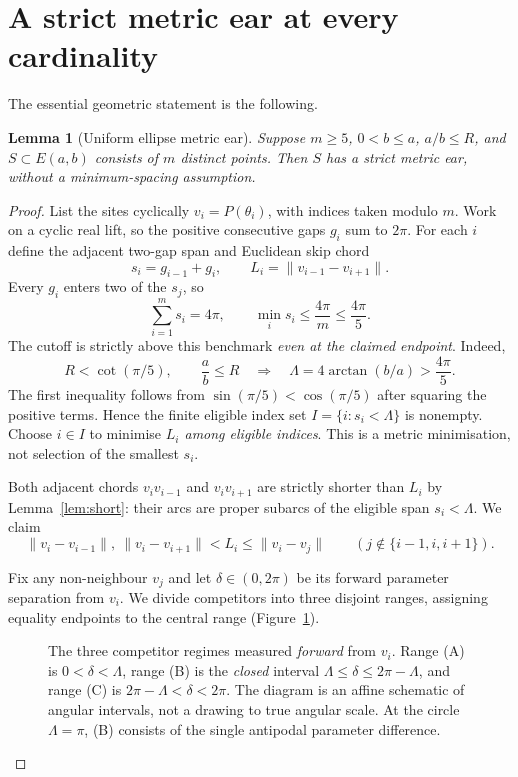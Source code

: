 \documentclass[11pt,a4paper]{article}
\newtheorem{lemma}[theorem]{Lemma}
\theoremstyle{definition}\newtheorem{definition}[theorem]{Definition}
\theoremstyle{remark}\newtheorem{remark}[theorem]{Remark}
\newcommand{\Rbound}{R}
\newcommand{\Ell}{E(a,b)}
\newcommand{\dist}[2]{\lVert #1-#2\rVert}
\begin{document}
\section{A strict metric ear at every cardinality}\label{sec:earproof}
The essential geometric statement is the following.
\begin{lemma}[Uniform ellipse metric ear]\label{lem:uniform}
Suppose $m\ge5$, $0<b\le a$, $a/b\le\Rbound$, and $S\subset\Ell$ consists of $m$ distinct points. Then $S$ has a strict metric ear, without a minimum-spacing assumption.
\end{lemma}
\begin{proof}
List the sites cyclically $v_i=P(\theta_i)$, with indices taken modulo $m$. Work on a cyclic real lift, so the positive consecutive gaps $g_i$ sum to $2\pi$. For each $i$ define the adjacent two-gap span and Euclidean skip chord
\[
 s_i=g_{i-1}+g_i,\qquad L_i=\dist{v_{i-1}}{v_{i+1}}.
\]
Every $g_i$ enters two of the $s_j$, so
\begin{equation}\label{eq:average}
 \sum_{i=1}^{m}s_i=4\pi,
 \qquad\min_i s_i\le\frac{4\pi}{m}\le\frac{4\pi}{5}.
\end{equation}
The cutoff is strictly above this benchmark \emph{even at the claimed endpoint}. Indeed,
\[
 \Rbound<\cot(\pi/5),\qquad
 \frac ab\le\Rbound\quad\Longrightarrow\quad
 \Lambda=4\arctan(b/a)>\frac{4\pi}{5}.
\]
The first inequality follows from $\sin(\pi/5)<\cos(\pi/5)$ after squaring the positive terms. Hence the finite eligible index set $I=\{i:s_i<\Lambda\}$ is nonempty. Choose $i\in I$ to minimise \emph{$L_i$ among eligible indices}. This is a metric minimisation, not selection of the smallest $s_i$.

Both adjacent chords $v_iv_{i-1}$ and $v_iv_{i+1}$ are strictly shorter than $L_i$ by Lemma~\ref{lem:short}: their arcs are proper subarcs of the eligible span $s_i<\Lambda$. We claim
\begin{equation}\label{eq:ear}
 \dist{v_i}{v_{i-1}},\ \dist{v_i}{v_{i+1}}<L_i
 \le\dist{v_i}{v_j}\qquad (j\notin\{i-1,i,i+1\}).
\end{equation}

Fix any non-neighbour $v_j$ and let $\delta\in(0,2\pi)$ be its forward parameter separation from $v_i$. We divide competitors into three disjoint ranges, assigning equality endpoints to the central range (Figure~\ref{fig:bands}).

\begin{figure}[ht]
\centering
\caption{The three competitor regimes measured \emph{forward} from $v_i$. Range (A) is $0<\delta<\Lambda$, range (B) is the \emph{closed} interval $\Lambda\le\delta\le2\pi-\Lambda$, and range (C) is $2\pi-\Lambda<\delta<2\pi$. The diagram is an affine schematic of angular intervals, not a drawing to true angular scale. At the circle $\Lambda=\pi$, (B) consists of the single antipodal parameter difference.}\label{fig:bands}
\end{figure}


\end{proof}
\end{document}
